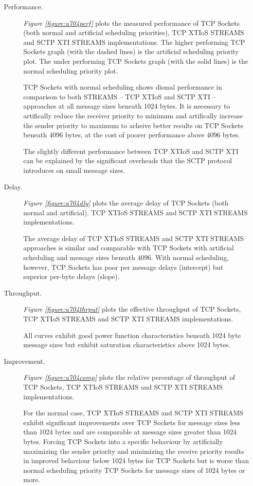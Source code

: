 \documentclass[letterpaper,final,notitlepage,twocolumn,10pt,twoside]{article}
\begin{document}
\begin{description}

\item[Performance.]

\textit{Figure \ref{figure:u704perf}}
plots the measured performance of TCP Sockets (both normal and artificial scheduling priorities),
TCP XTIoS STREAMS and SCTP XTI STREAMS implementations.  The higher performing TCP Sockets graph
(with the dashed lines) is the artificial scheduling priority plot.  The under performing TCP
Sockets graph (with the solid lines) is the normal scheduling priority plot.

TCP Sockets with normal scheduling shows dismal performance in comparison to both STREAMS -- TCP
XTIoS and SCTP XTI -- approaches at all message sizes beneath 1024 bytes.  It is necessary to
artifically reduce the receiver priority to minimum and artifically increase the sender priority to
maximum to acheive better results on TCP Sockets beneath 4096 bytes, at the cost of poorer
performance above 4096 bytes.

The slightly different performance between TCP XTIoS and SCTP XTI can be explained by the
significant overheads that the SCTP protocol introduces on small message sizes.

\item[Delay.]

\textit{Figure \ref{figure:u704dly}}
plots the average delay of TCP Sockets (both normal and artificial), TCP XTIoS STREAMS and SCTP XTI
STREAMS implementations.

The average delay of TCP XTIoS STREAMS and SCTP XTI STREAMS approaches is similar and comparable
with TCP Sockets with artificial scheduling and message sizes beneath 4096.  With normal scheduling,
however, TCP Sockets has poor per message delays (intercept) but superior per-byte delays (slope).

\item[Throughput.]

\textit{Figure \ref{figure:u704thrput}}
plots the effective throughput of TCP Sockets, TCP XTIoS STREAMS and SCTP XTI STREAMS
implementations.

All curves exhibit good power function characteristics beneath 1024 byte  message sizes but exhibit
saturation characteristics above 1024 bytes.

\item[Improvement.]

\textit{Figure \ref{figure:u704comp}}
plots the relative percentage of throughput of TCP Sockets, TCP XTIoS STREAMS and SCTP XTI STREAMS
implementations.

For the normal case, TCP XTIoS STREAMS and SCTP XTI STREAMS exhibit significant improvements over
TCP Sockets for message sizes less than 1024 bytes and are comparable  at message sizes greater than
1024 bytes.  Forcing TCP Sockets into a specific behaviour by artificially maximizing the sender
priority and minimizing the receive priority results in improved behaviour below 1024 bytes for TCP
Sockets but is worse than normal scheduling priority TCP Sockets for message sizes of 1024 bytes or
more.

\end{description}
\end{document}
